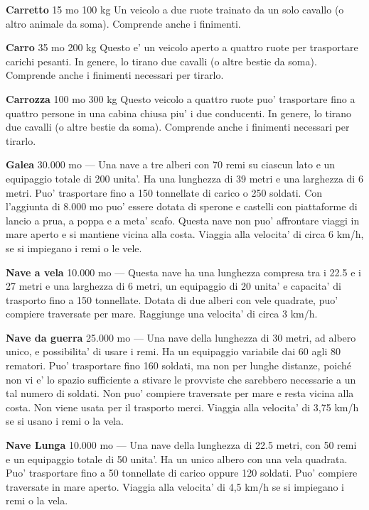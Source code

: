\documentclass[a4paper,11pt,twoside,openany]{dndbook}
\begin{document}
{\textbf{Carretto} 15 mo 100 kg Un veicolo a due ruote trainato da un solo cavallo (o altro animale da soma). Comprende anche i finimenti.

\textbf{Carro} 35 mo 200 kg Questo e' un veicolo aperto a quattro ruote per trasportare carichi pesanti. In genere, lo tirano due cavalli (o altre bestie da soma). Comprende anche i finimenti necessari per tirarlo.

\textbf{Carrozza} 100 mo 300 kg Questo veicolo a quattro ruote puo' trasportare fino a quattro persone in una cabina chiusa piu' i due conducenti. In genere, lo tirano due cavalli (o altre bestie da soma). Comprende anche i finimenti necessari per tirarlo.

\textbf{Galea} 30.000 mo --- Una nave a tre alberi con 70 remi su ciascun lato e un equipaggio totale di 200 unita'. Ha una lunghezza di 39 metri e una larghezza di 6 metri. Puo' trasportare fino a 150 tonnellate di carico o 250 soldati. Con l'aggiunta di 8.000 mo puo' essere dotata di sperone e castelli con piattaforme di lancio a prua, a poppa e a meta' scafo. Questa nave non puo' affrontare viaggi in mare aperto e si mantiene vicina alla costa. Viaggia alla velocita' di circa 6 km/h, se si impiegano i remi o le vele.

\textbf{Nave a vela} 10.000 mo --- Questa nave ha una lunghezza compresa tra i 22.5 e i 27 metri e una larghezza di 6 metri, un equipaggio di 20 unita' e capacita' di trasporto fino a 150 tonnellate. Dotata di due alberi con vele quadrate, puo' compiere traversate per mare. Raggiunge una velocita' di circa 3 km/h. 

\textbf{Nave da guerra} 25.000 mo --- Una nave della lunghezza di 30 metri, ad albero unico, e possibilita' di usare i remi. Ha un equipaggio variabile dai 60 agli 80 rematori. Puo' trasportare fino 160 soldati, ma non per lunghe distanze, poiché non vi e' lo spazio sufficiente a stivare le provviste che sarebbero necessarie a un tal numero di soldati. Non puo' compiere traversate per mare e resta vicina alla costa. Non viene usata per il trasporto merci. Viaggia alla velocita' di 3,75 km/h se si usano i remi o la vela.

\textbf{Nave Lunga} 10.000 mo --- Una nave della lunghezza di 22.5 metri, con 50 remi e un equipaggio totale di 50 unita'. Ha un unico albero con una vela quadrata. Puo' trasportare fino a 50 tonnellate di carico oppure 120 soldati. Puo' compiere traversate in mare aperto. Viaggia alla velocita' di 4,5 km/h se si impiegano i remi o la vela.

}
\end{document}
